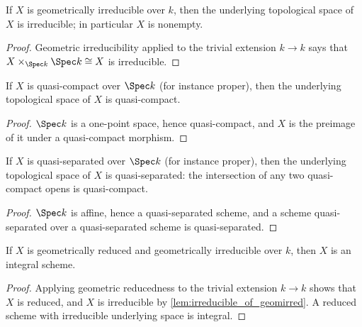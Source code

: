 \begin{lemma}[Irreducibility]
  \label{lem:irreducible_of_geomirred}
  \leanok
  If \(X\) is geometrically irreducible over \(k\), then the underlying topological space of
  \(X\) is irreducible; in particular \(X\) is nonempty.
\end{lemma}
\begin{proof}
  \leanok
  Geometric irreducibility applied to the trivial extension \(k \to k\) says that
  \(X \times_{\Spec k} \Spec k \cong X\) is irreducible.
\end{proof}

\begin{lemma}
  \label{lem:curve_compact}
  \leanok
  If \(X\) is quasi-compact over \(\Spec k\) (for instance proper), then the underlying
  topological space of \(X\) is quasi-compact.
\end{lemma}
\begin{proof}
  \leanok
  \(\Spec k\) is a one-point space, hence quasi-compact, and \(X\) is the preimage of it
  under a quasi-compact morphism.
\end{proof}

\begin{lemma}
  \label{lem:curve_quasiseparated}
  \leanok
  If \(X\) is quasi-separated over \(\Spec k\) (for instance proper), then the underlying
  topological space of \(X\) is quasi-separated: the intersection of any two quasi-compact
  opens is quasi-compact.
\end{lemma}
\begin{proof}
  \leanok
  \(\Spec k\) is affine, hence a quasi-separated scheme, and a scheme quasi-separated over a
  quasi-separated scheme is quasi-separated.
\end{proof}

\begin{proposition}[Integrality]
  \label{prop:curve_integral}
  \leanok
  If \(X\) is geometrically reduced and geometrically irreducible over \(k\), then \(X\) is an
  integral scheme.
\end{proposition}
\begin{proof}
  \leanok
  Applying geometric reducedness to the trivial extension \(k \to k\) shows that \(X\) is
  reduced, and \(X\) is irreducible by \ref{lem:irreducible_of_geomirred}. A reduced scheme
  with irreducible underlying space is integral.
\end{proof}

